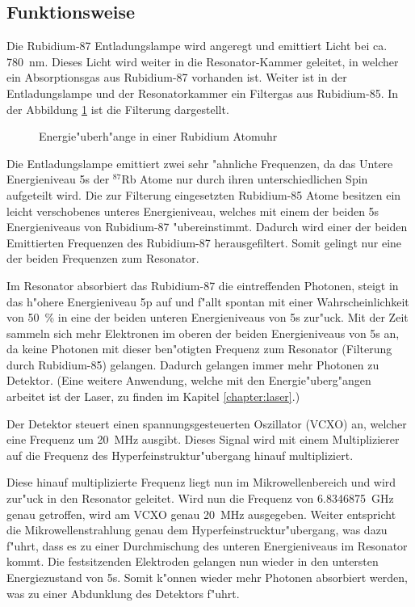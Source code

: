 \begin{refsection}
\subsection{Funktionsweise}
Die Rubidium-87 Entladungslampe wird angeregt und emittiert Licht bei
ca. \SI{780}{\nano\meter}.  Dieses Licht wird weiter in die
Resonator-Kammer geleitet, in welcher ein Absorptionsgas aus
Rubidium-87 vorhanden ist.  Weiter ist in der Entladungslampe und der
Resonatorkammer ein Filtergas aus Rubidium-85.  In der Abbildung
\ref{fig:uebergaenge} ist die Filterung dargestellt.

\begin{figure}
  \centering
  
  \caption{Energie"uberh"ange in einer Rubidium Atomuhr}
  \label{fig:uebergaenge}
\end{figure}

Die Entladungslampe emittiert zwei sehr "ahnliche Frequenzen, da das
Untere Energieniveau 5s der $^{87}$Rb Atome nur durch ihren
unterschiedlichen Spin aufgeteilt wird.  Die zur Filterung
eingesetzten Rubidium-85 Atome besitzen ein leicht verschobenes
unteres Energieniveau, welches mit einem der beiden 5s Energieniveaus
von Rubidium-87 "ubereinstimmt.  Dadurch wird einer der beiden
Emittierten Frequenzen des Rubidium-87 herausgefiltert.  Somit gelingt
nur eine der beiden Frequenzen zum Resonator.

Im Resonator absorbiert das Rubidium-87 die eintreffenden Photonen,
steigt in das h"ohere Energieniveau 5p auf und f"allt spontan mit
einer Wahrscheinlichkeit von \SI{50}{\percent} in eine der beiden
unteren Energieniveaus von 5s zur"uck.  Mit der Zeit sammeln sich mehr
Elektronen im oberen der beiden Energieniveaus von 5s an, da keine
Photonen mit dieser ben"otigten Frequenz zum Resonator (Filterung durch
Rubidium-85) gelangen.  Dadurch gelangen immer mehr Photonen zu
Detektor. (Eine weitere Anwendung, welche mit den Energie"uberg"angen
arbeitet ist der Laser, zu finden im Kapitel \ref{chapter:laser}.)

Der Detektor steuert einen spannungsgesteuerten Oszillator (VCXO) an,
welcher eine Frequenz um \SI{20}{\mega\hertz} ausgibt.  Dieses Signal
wird mit einem Multiplizierer auf die Frequenz des
Hyperfeinstruktur"ubergang hinauf multipliziert.

Diese hinauf multiplizierte Frequenz liegt nun im Mikrowellenbereich
und wird zur"uck in den Resonator geleitet.  Wird nun die Frequenz von
\SI{6.8346875}{\giga\hertz} genau getroffen, wird am VCXO genau
\SI{20}{\mega\hertz} ausgegeben.  Weiter entspricht die
Mikrowellenstrahlung genau dem Hyperfeinstrucktur"ubergang, was dazu
f"uhrt, dass es zu einer Durchmischung des unteren Energieniveaus im
Resonator kommt.  Die festsitzenden Elektroden gelangen nun wieder in
den untersten Energiezustand von 5s.  Somit k"onnen wieder mehr
Photonen absorbiert werden, was zu einer Abdunklung des Detektors
f"uhrt.


\end{refsection}
